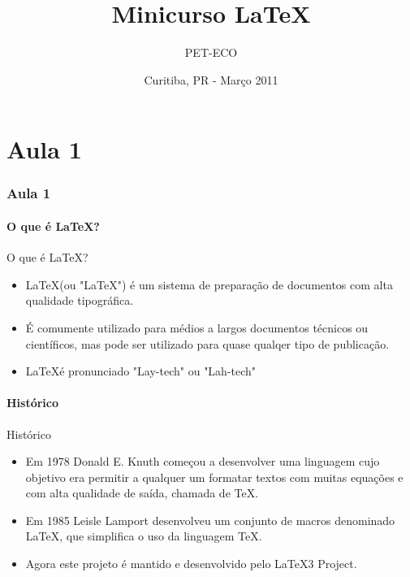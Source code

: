 \documentclass{beamer}
\title{Minicurso \LaTeX}
\author{PET-ECO}
\institute{Universidade Teconlógica Federal do Paraná}
\date{Curitiba, PR - Março 2011}
\begin{document}
\begin{frame}
	\titlepage
\end{frame}


\part{Aula 1}
\section{Aula 1}

\subsection{O que é \LaTeX?}

\begin{frame}{O que é \LaTeX?}
    \begin{itemize}
    \item \LaTeX (ou "LaTeX") é um sistema de preparação de documentos com alta qualidade tipográfica.
    \item É comumente utilizado para médios a largos documentos técnicos ou científicos, mas pode ser utilizado para quase qualqer tipo de publicação.
    \item \LaTeX é pronunciado "Lay-tech" ou "Lah-tech"
    \end{itemize}
\end{frame}

\subsection{Histórico}

\begin{frame}{Histórico}
    \begin{itemize}
    \item Em 1978 Donald E. Knuth começou a desenvolver uma linguagem cujo objetivo era permitir a qualquer um formatar textos com muitas equações e com alta qualidade de saída, chamada de \TeX.
    \item Em 1985 Leisle Lamport desenvolveu um conjunto de macros denominado \LaTeX, que simplifica o uso da linguagem \TeX.
    \item Agora este projeto é mantido e desenvolvido pelo \LaTeX3 Project.
    \end{itemize}
\end{frame}
\end{document}
